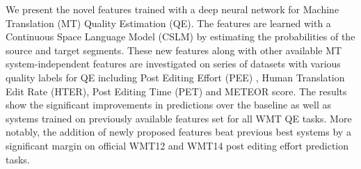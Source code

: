 We present the novel  features trained with a deep neural network for Machine Translation (MT) Quality Estimation (QE). The features are learned with a Continuous Space Language Model (CSLM) by estimating the probabilities of the source and target segments. These new features along with other available MT system-independent features  are investigated on series of  datasets with various  quality labels for QE including Post Editing Effort (PEE) , Human Translation Edit Rate (HTER), Post Editing Time (PET) and METEOR score. The results show the significant improvements in predictions over the baseline as well as systems trained on previously available features set for all WMT QE tasks. More notably,  the addition of newly proposed features beat previous best systems by a significant margin on official WMT12 and WMT14 post editing effort prediction tasks.
